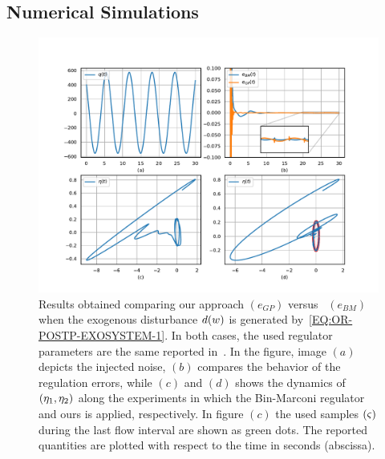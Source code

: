 \subsection{Numerical Simulations}%
\label{SEC:OR-POSTP-NUMERICAL-SIMULATIONS}
\begin{figure}[!t]
	\centering
	\includegraphics[width=1.\textwidth]{Figs/Chapter8-9/postprocessing_lin_example.pdf}
	\caption{Results obtained comparing our approach $(e_{GP})$ versus~\cite{bin2019class} $(e_{BM})$ when the exogenous disturbance $d(w)$ is generated by~\eqref{EQ:OR-POSTP-EXOSYSTEM-1}.
	In both cases, the used regulator parameters are the same reported in~.
	In the figure, image $(a)$ depicts the injected noise, $(b)$ compares the behavior of the regulation errors, while $(c)$ and $(d)$ shows the dynamics of $(\eta_1, \eta_2)$
	along the experiments in which the Bin-Marconi regulator~\cite{bin2019class} and ours is applied, respectively. In figure $(c)$ the used samples $(\varsigma)$ during the last
	flow interval are shown as green dots. The reported quantities are plotted with respect to the time in seconds (abscissa).}
	\label{FIG:OR-POSTPROCESSING-LIN-RESULTS}
\end{figure}
